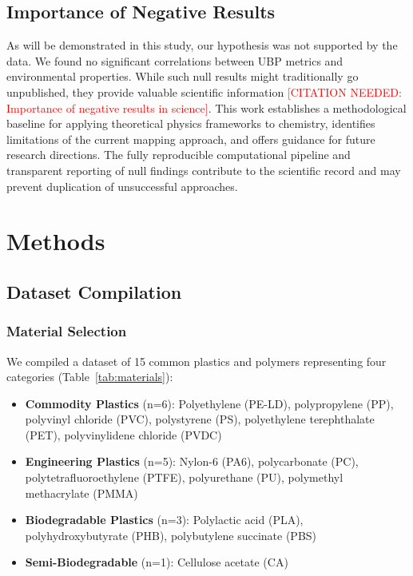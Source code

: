 \documentclass[11pt,letterpaper]{article}
\begin{document}
\subsection{Importance of Negative Results}

As will be demonstrated in this study, our hypothesis was not supported by the data. We found no significant correlations between UBP metrics and environmental properties. While such null results might traditionally go unpublished, they provide valuable scientific information \textcolor{red}{[CITATION NEEDED: Importance of negative results in science]}. This work establishes a methodological baseline for applying theoretical physics frameworks to chemistry, identifies limitations of the current mapping approach, and offers guidance for future research directions. The fully reproducible computational pipeline and transparent reporting of null findings contribute to the scientific record and may prevent duplication of unsuccessful approaches.

\section{Methods}

\subsection{Dataset Compilation}

\subsubsection{Material Selection}
We compiled a dataset of 15 common plastics and polymers representing four categories (Table~\ref{tab:materials}):

\begin{itemize}
    \item \textbf{Commodity Plastics} (n=6): Polyethylene (PE-LD), polypropylene (PP), polyvinyl chloride (PVC), polystyrene (PS), polyethylene terephthalate (PET), polyvinylidene chloride (PVDC)
    \item \textbf{Engineering Plastics} (n=5): Nylon-6 (PA6), polycarbonate (PC), polytetrafluoroethylene (PTFE), polyurethane (PU), polymethyl methacrylate (PMMA)
    \item \textbf{Biodegradable Plastics} (n=3): Polylactic acid (PLA), polyhydroxybutyrate (PHB), polybutylene succinate (PBS)
    \item \textbf{Semi-Biodegradable} (n=1): Cellulose acetate (CA)
\end{itemize}
\end{document}
